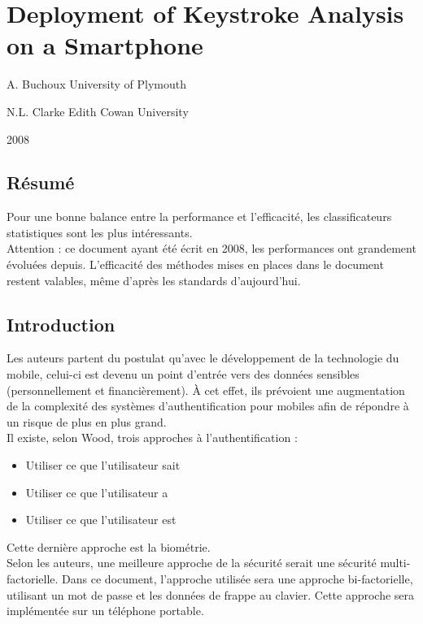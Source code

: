 \section{Deployment of Keystroke Analysis on a Smartphone}

A. Buchoux
University of Plymouth

N.L. Clarke
Edith Cowan University

2008

\subsection{Résumé}

Pour une bonne balance entre la performance et l'efficacité, les classificateurs statistiques sont les plus intéressants.\\

Attention : ce document ayant été écrit en 2008, les performances ont grandement évoluées depuis. L'efficacité des méthodes mises en places dans le document restent valables, même d'après les standards d'aujourd'hui.

\subsection{Introduction}

Les auteurs partent du postulat qu'avec le développement de la technologie du mobile, celui-ci est devenu un point d'entrée vers des données sensibles (personnellement et financièrement). À cet effet, ils prévoient une augmentation de la complexité des systèmes d'authentification pour mobiles afin de répondre à un risque de plus en plus grand.\\

Il existe, selon Wood, trois approches à l'authentification :\\

\begin{itemize}
  \item Utiliser ce que l'utilisateur sait
  \item Utiliser ce que l'utilisateur a
  \item Utiliser ce que l'utilisateur est\\
\end{itemize}

Cette dernière approche est la biométrie.\\

Selon les auteurs, une meilleure approche de la sécurité serait une sécurité multi-factorielle. Dans ce document, l'approche utilisée sera une approche bi-factorielle, utilisant un mot de passe et les données de frappe au clavier. Cette approche sera implémentée sur un téléphone portable.

